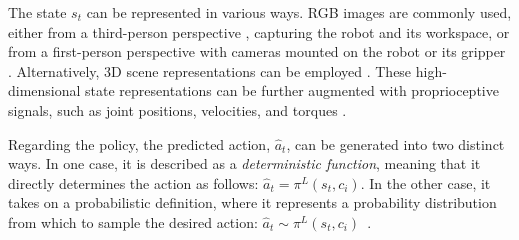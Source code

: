 The state $s_{t}$ can be represented in various ways. RGB images are commonly used, either from a third-person perspective \cite{james2018task_embedded}, capturing the robot and its workspace, or from a first-person perspective with cameras mounted on the robot \cite{jang2022bc_z} or its gripper \cite{mees2022calvin}. Alternatively, 3D scene representations can be employed \cite{shridhar2023perceiver}. These high-dimensional state representations can be further augmented with proprioceptive signals, such as joint positions, velocities, and torques \cite{zhang2018deep_vr_teleoperation}.


Regarding the policy, the predicted action, $\hat{a}_{t}$, can be generated into two distinct ways. In one case, it is described as a \textit{deterministic function}, meaning that it directly determines the action as follows: $\hat{a}_{t} = \pi^{L}(s_{t}, c_{i})$\cite{jang2022bc_z}. In the other case, it takes on a probabilistic definition, where it represents a probability distribution from which to sample the desired action: $\hat{a}_{t} \sim \pi^{L}(s_{t}, c_{i})$~\cite{mandi2022towards_more_generalizable_one_shot}.

